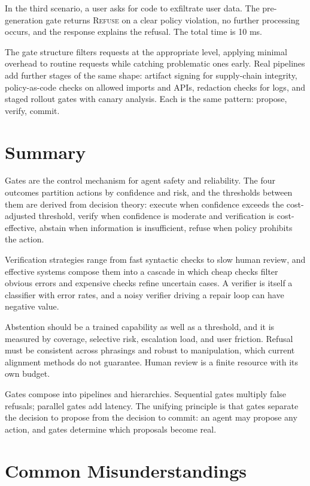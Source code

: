 \documentclass[11pt]{book}
\begin{document}
In the third scenario, a user asks for code to exfiltrate user data. The pre-generation gate returns \textsc{Refuse} on a clear policy violation, no further processing occurs, and the response explains the refusal. The total time is 10 ms.

The gate structure filters requests at the appropriate level, applying minimal overhead to routine requests while catching problematic ones early. Real pipelines add further stages of the same shape: artifact signing for supply-chain integrity, policy-as-code checks on allowed imports and APIs, redaction checks for logs, and staged rollout gates with canary analysis. Each is the same pattern: propose, verify, commit.

\section{Summary}

Gates are the control mechanism for agent safety and reliability. The four outcomes partition actions by confidence and risk, and the thresholds between them are derived from decision theory: execute when confidence exceeds the cost-adjusted threshold, verify when confidence is moderate and verification is cost-effective, abstain when information is insufficient, refuse when policy prohibits the action.

Verification strategies range from fast syntactic checks to slow human review, and effective systems compose them into a cascade in which cheap checks filter obvious errors and expensive checks refine uncertain cases. A verifier is itself a classifier with error rates, and a noisy verifier driving a repair loop can have negative value.

Abstention should be a trained capability as well as a threshold, and it is measured by coverage, selective risk, escalation load, and user friction. Refusal must be consistent across phrasings and robust to manipulation, which current alignment methods do not guarantee. Human review is a finite resource with its own budget.

Gates compose into pipelines and hierarchies. Sequential gates multiply false refusals; parallel gates add latency. The unifying principle is that gates separate the decision to propose from the decision to commit: an agent may propose any action, and gates determine which proposals become real.

\section{Common Misunderstandings}
\end{document}
